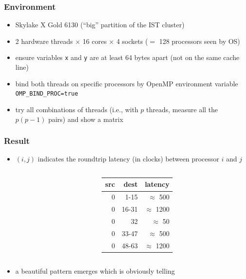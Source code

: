 \documentclass[12pt,dvipdfmx]{beamer}
\begin{document}
\begin{frame}
\frametitle{Environment}
\begin{itemize}
\item Skylake X Gold 6130 (``big'' partition of the IST cluster)
\item 2 hardware threads $\times$ 16 cores $\times$ 4 sockets 
  ($=$ 128 processors seen by OS)

\item ensure variables {\tt x} and {\tt y} 
  are at least 64 bytes apart
  (not on the same cache line)
\item bind both threads on specific processors
  by OpenMP environment variable {\tt OMP\_BIND\_PROC=true} 
\item try all combinations of threads
  (i.e., with $p$ threads, measure all the $p(p-1)$ pairs)
  and show a matrix
\end{itemize}
\end{frame}


\iffalse
\begin{frame}
\frametitle{Result}
\begin{itemize}
\item $(i,j)$ indicates the roundtrip latency (in clocks)
  between processor $i$ and $j$

  \begin{columns}
    \begin{column}{0.6\textwidth}
{\scriptsize}
    \end{column}
    \begin{column}{0.4\textwidth}
{\footnotesize
\begin{tabular}{|r|r|r|}\hline
src & dest & latency \\\hline
0 & 1-15   & $\approx$ 500 \\
0 & 16-31  & $\approx$ 1200 \\
0 & 32     & $\approx$ 50 \\
0 & 33-47  & $\approx$ 500 \\
0 & 48-63  & $\approx$ 1200 \\\hline
\end{tabular}}
    \end{column}
  \end{columns}

\item a beautiful pattern emerges which is obviously telling

\end{itemize}
\end{frame}
\end{document}
